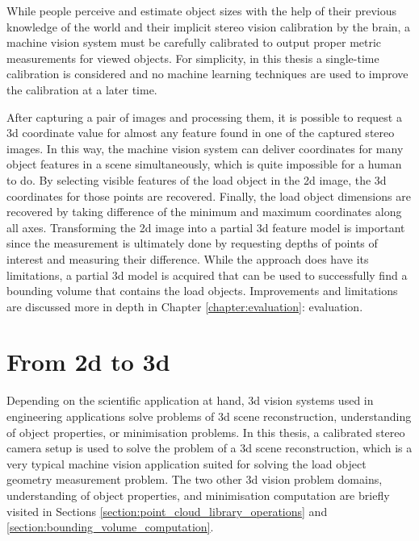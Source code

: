 \documentclass[12pt,a4paper,oneside,pdftex]{report}
\begin{document}
While people perceive and estimate object sizes with the help of their previous knowledge of the world and their implicit stereo vision calibration by the brain, a machine vision system must be carefully calibrated to output proper metric measurements for viewed objects. For simplicity, in this thesis a single-time calibration is considered and no machine learning techniques are used to improve the calibration at a later time.

After capturing a pair of images and processing them, it is possible to request a 3d coordinate value for almost any feature found in one of the captured stereo images. In this way, the machine vision system can deliver coordinates for many object features in a scene simultaneously, which is quite impossible for a human to do. By selecting visible features of the load object in the 2d image, the 3d coordinates for those points are recovered. Finally, the load object dimensions are recovered by taking difference of the minimum and maximum coordinates along all axes. Transforming the 2d image into a partial 3d feature model is important since the measurement is ultimately done by requesting depths of points of interest and measuring their difference. While the approach does have its limitations, a partial 3d model is acquired that can be used to successfully find a bounding volume that contains the load objects. Improvements and limitations are discussed more in depth in Chapter \ref{chapter:evaluation}: evaluation.

\section{From 2d to 3d}
\label{section:from_2d_to_3d}

Depending on the scientific application at hand, 3d vision systems used in engineering applications solve problems of 3d scene reconstruction, understanding of object properties, or minimisation problems. In this thesis, a calibrated stereo camera setup is used to solve the problem of a 3d scene reconstruction, which is a very typical machine vision application suited for solving the load object geometry measurement problem. The two other 3d vision problem domains, understanding of object properties, and minimisation computation are briefly visited in Sections \ref{section:point_cloud_library_operations} and \ref{section:bounding_volume_computation}. \citep{Sonka07}
\end{document}
